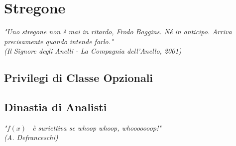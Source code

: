 \chapter{Stregone}

\begin{DndReadAloud}
    \it
    "Uno stregone non è mai in ritardo, Frodo Baggins. Né in anticipo. Arriva precisamente quando intende farlo." \\ (Il Signore degli Anelli - La Compagnia dell'Anello, 2001)
  \end{DndReadAloud}

\section{Privilegi di Classe Opzionali}

\section{Dinastia di Analisti}

\begin{DndReadAloud}
    \it
    "\begin{math}f(x)\end{math} \ è suriettiva se whoop whoop, whooooooop!" \\ (A. Defranceschi)
  \end{DndReadAloud}

